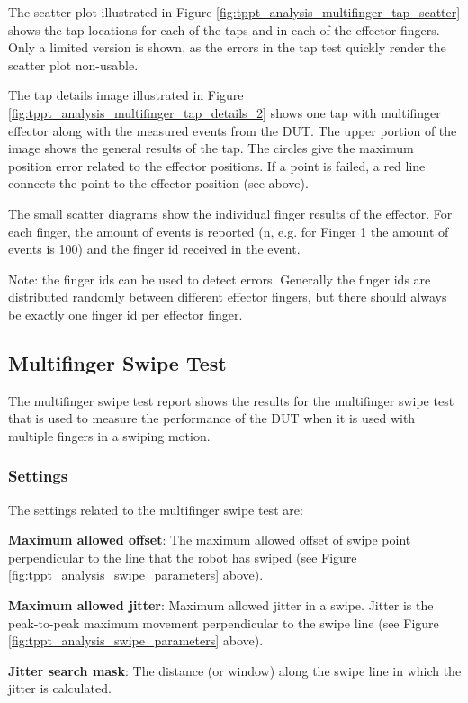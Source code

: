 The scatter plot illustrated in Figure \ref{fig:tppt_analysis_multifinger_tap_scatter} shows the tap locations for each of the taps and in each of the effector fingers. Only a limited version is shown, as the errors in the tap test quickly render the scatter plot non-usable.

The tap details image illustrated in Figure \ref{fig:tppt_analysis_multifinger_tap_details_2} shows one tap with multifinger effector along with the measured events from the DUT. The upper portion of the image shows the general results of the tap. The circles give the maximum position error related to the effector positions. If a point is failed, a red line connects the point to the effector position (see above). 

The small scatter diagrams show the individual finger results of the effector. For each finger, the amount of events is reported (n, e.g. for Finger 1 the amount of events is 100) and the finger id received in the event. 

Note: the finger ids can be used to detect errors. Generally the finger ids are distributed randomly between different effector fingers, but there should always be exactly one finger id per effector finger.

\subsection{Multifinger Swipe Test}

The multifinger swipe test report shows the results for the multifinger swipe test that is used to measure the performance of the DUT when it is used with multiple fingers in a swiping motion.

\subsubsection{Settings}

The settings related to the multifinger swipe test are:

\textbf{Maximum allowed offset}: The maximum allowed offset of swipe point perpendicular to the line that the robot has swiped (see Figure \ref{fig:tppt_analysis_swipe_parameters} above). 

\textbf{Maximum allowed jitter}: Maximum allowed jitter in a swipe. Jitter is the peak-to-peak maximum movement perpendicular to the swipe line (see Figure \ref{fig:tppt_analysis_swipe_parameters} above). 

\textbf{Jitter search mask}: The distance (or window) along the swipe line in which the jitter is calculated. 

